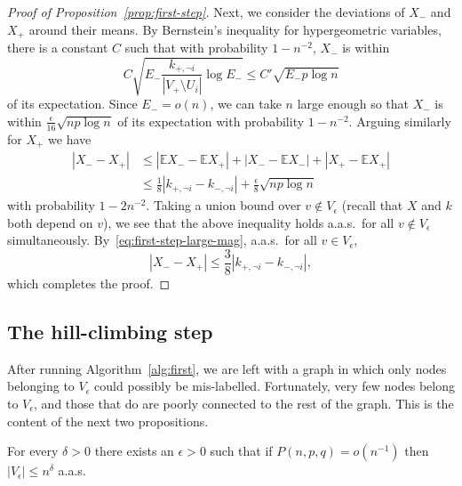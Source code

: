 \documentclass[EJP,final]{ejpecp}
\newcommand{\E}{\mathbb{E}}
\newcommand{\1}[1]{\mathbbm{1}_{\{#1\}}}
\newcommand{\noti}{\lnot i}
\begin{document}
\begin{proof}[Proof of Proposition~\ref{prop:first-step}]
 Next, we consider the deviations of $X_-$ and $X_+$ around their means.
 By Bernstein's inequality for hypergeometric variables, there is a constant
 $C$ such that with probability $1-n^{-2}$, $X_-$ is within
 \[
  C \sqrt{E_- \frac{k_{+,\noti}}{|V_+ \setminus U_i|} \log E_-}
  \le C' \sqrt{E_- p \log n}
 \]
 of its expectation. Since $E_- = o(n)$, we can take $n$ large enough
 so that $X_-$ is within $\frac{\epsilon}{16}\sqrt{np \log n}$ of its expectation
 with probability $1 - n^{-2}$. Arguing similarly for $X_+$ we have
 \begin{align*}
  |X_- - X_+|
  &\le |\E X_- - \E X_+| + |X_- - \E X_-| + |X_+ - \E X_+| \\
  &\le \frac{1}{8} |k_{+,\noti} - k_{-,\noti}| + \frac{\epsilon}{8} \sqrt{np \log n}
 \end{align*}
 with probability $1-2n^{-2}$. Taking a union bound over $v \not \in V_\epsilon$ (recall that $X$ and $k$ both depend on $v$), we see that the above
 inequality holds a.a.s.\ for all $v \not \in V_\epsilon$ simultaneously.
 By~\eqref{eq:first-step-large-mag}, a.a.s.\ for all $v \in V_\epsilon$,
 \[
   |X_- - X_+| \le \frac 38 |k_{+,\noti} - k_{-,\noti}|,
 \]
 which completes the proof.
\end{proof}

\subsection{The hill-climbing step}\label{sec:second-step}

After running Algorithm~\ref{alg:first}, we are left with a graph
in which only nodes belonging to $V_\epsilon$ could possibly be mis-labelled.
Fortunately, very few nodes belong to $V_\epsilon$, and those that do are poorly
connected to the rest of the graph. This is the content of the next
two propositions.

\begin{proposition}\label{prop:Ve-size}
 For every $\delta > 0$ there exists an $\epsilon > 0$ such that
 if $P(n, p, q) = o(n^{-1})$ then
 $|V_\epsilon| \le n^\delta$ a.a.s.
\end{proposition}
\end{document}
